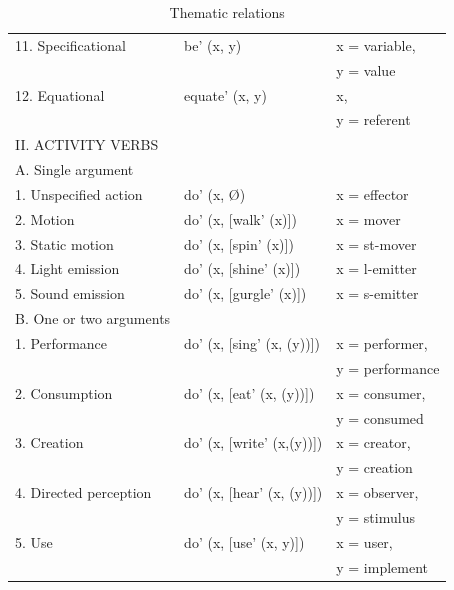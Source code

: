 \begin{table}[H]
\begin{tabular}{@{}lll@{}}
\hspace{4em}11. Specificational & be' (x, y) & x = variable, \\ & &
y = value \\
\hspace{4em}12. Equational & equate' (x, y) & x, \\ & & y = referent \\
II. ACTIVITY VERBS  && \\
\hspace{2em}A. Single argument  && \\
\hspace{4em}1. Unspecified action & do' (x, Ø) & x = effector \\
\hspace{4em}2. Motion & do' (x, [walk' (x)]) & x = mover \\
\hspace{4em}3. Static motion & do' (x, [spin' (x)]) &  x = st-mover \\
\hspace{4em}4. Light emission & do' (x, [shine' (x)]) & x = l-emitter \\
\hspace{4em}5. Sound emission & do' (x, [gurgle' (x)]) & x = s-emitter \\
\hspace{2em}B. One or two arguments && \\
\hspace{4em}1. Performance & do' (x, [sing' (x, (y))]) & x = performer, \\ && y = performance \\
\hspace{4em}2. Consumption & do' (x, [eat' (x, (y))]) & x = consumer, \\ &&
y = consumed \\
\hspace{4em}3. Creation & do' (x, [write' (x,(y))]) & x = creator, \\ &&
y = creation \\
\hspace{4em}4. Directed perception & do' (x, [hear' (x, (y))]) & x = observer,  \\ && y = stimulus \\
\hspace{4em}5. Use & do' (x, [use' (x, y)]) & x = user, \\
&& y = implement \\
\hline
\end{tabular}
\caption{Thematic relations}
\label{tab:my-table}
\end{table}


